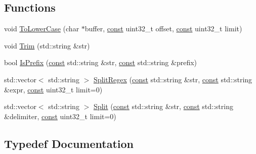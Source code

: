 \subsection*{Functions}
\begin{DoxyCompactItemize}
\item 
void \mbox{\hyperlink{namespacelucene_1_1core_1_1analysis_1_1characterutil_a8970bd9664a398220515d53e97cb051c}{To\+Lower\+Case}} (char $\ast$buffer, \mbox{\hyperlink{ZlibCrc32_8h_a2c212835823e3c54a8ab6d95c652660e}{const}} uint32\+\_\+t offset, \mbox{\hyperlink{ZlibCrc32_8h_a2c212835823e3c54a8ab6d95c652660e}{const}} uint32\+\_\+t limit)
\item 
void \mbox{\hyperlink{namespacelucene_1_1core_1_1analysis_1_1characterutil_a8deb75debf79b7151ec2fed2b932bdde}{Trim}} (std\+::string \&str)
\item 
bool \mbox{\hyperlink{namespacelucene_1_1core_1_1analysis_1_1characterutil_a95456ad6dbf1995507914b6b32fca8df}{Is\+Prefix}} (\mbox{\hyperlink{ZlibCrc32_8h_a2c212835823e3c54a8ab6d95c652660e}{const}} std\+::string \&str, \mbox{\hyperlink{ZlibCrc32_8h_a2c212835823e3c54a8ab6d95c652660e}{const}} std\+::string \&prefix)
\item 
std\+::vector$<$ std\+::string $>$ \mbox{\hyperlink{namespacelucene_1_1core_1_1analysis_1_1characterutil_ab8a8fe2b305fad128673af6acf6ed291}{Split\+Regex}} (\mbox{\hyperlink{ZlibCrc32_8h_a2c212835823e3c54a8ab6d95c652660e}{const}} std\+::string \&str, \mbox{\hyperlink{ZlibCrc32_8h_a2c212835823e3c54a8ab6d95c652660e}{const}} std\+::string \&expr, \mbox{\hyperlink{ZlibCrc32_8h_a2c212835823e3c54a8ab6d95c652660e}{const}} uint32\+\_\+t limit=0)
\item 
std\+::vector$<$ std\+::string $>$ \mbox{\hyperlink{namespacelucene_1_1core_1_1analysis_1_1characterutil_a9f1e4e8422bdc82acbdd2170e3123271}{Split}} (\mbox{\hyperlink{ZlibCrc32_8h_a2c212835823e3c54a8ab6d95c652660e}{const}} std\+::string \&str, \mbox{\hyperlink{ZlibCrc32_8h_a2c212835823e3c54a8ab6d95c652660e}{const}} std\+::string \&delimiter, \mbox{\hyperlink{ZlibCrc32_8h_a2c212835823e3c54a8ab6d95c652660e}{const}} uint32\+\_\+t limit=0)
\end{DoxyCompactItemize}


\subsection{Typedef Documentation}
\mbox{\label{namespacelucene_1_1core_1_1analysis_1_1characterutil_a2b64bd3cca4a8e9112fcbfaebc68aeee}} 
